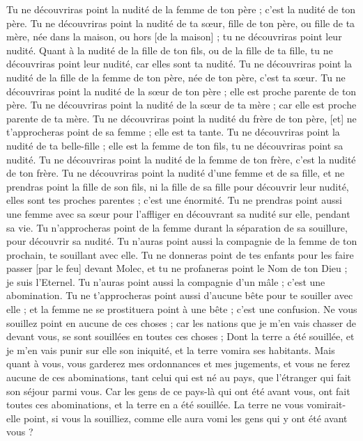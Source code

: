 \begin{multicols}{2}
Tu ne découvriras point la nudité de la femme de ton père ; c'est la nudité de ton père.
Tu ne découvriras point la nudité de ta sœur, fille de ton père, ou fille de ta mère, née dans la maison, ou hors [de la maison] ; tu ne découvriras point leur nudité.
Quant à la nudité de la fille de ton fils, ou de la fille de ta fille, tu ne découvriras point leur nudité, car elles sont ta nudité.
Tu ne découvriras point la nudité de la fille de la femme de ton père, née de ton père, c'est ta sœur.
Tu ne découvriras point la nudité de la sœur de ton père ; elle est proche parente de ton père.
Tu ne découvriras point la nudité de la sœur de ta mère ; car elle est proche parente de ta mère.
Tu ne découvriras point la nudité du frère de ton père, [et] ne t'approcheras point de sa femme ; elle est ta tante.
Tu ne découvriras point la nudité de ta belle-fille ; elle est la femme de ton fils, tu ne découvriras point sa nudité.
Tu ne découvriras point la nudité de la femme de ton frère, c'est la nudité de ton frère.
Tu ne découvriras point la nudité d'une femme et de sa fille, et ne prendras point la fille de son fils, ni la fille de sa fille pour découvrir leur nudité, elles sont tes proches parentes ; c'est une énormité.
Tu ne prendras point aussi une femme avec sa sœur pour l'affliger en découvrant sa nudité sur elle, pendant sa vie.
Tu n'approcheras point de la femme durant la séparation de sa souillure, pour découvrir sa nudité.
Tu n'auras point aussi la compagnie de la femme de ton prochain, te souillant avec elle.
Tu ne donneras point de tes enfants pour les faire passer [par le feu] devant Molec, et tu ne profaneras point le Nom de ton Dieu ; je suis l'Eternel.
Tu n'auras point aussi la compagnie d'un mâle ; c'est une abomination.
Tu ne t'approcheras point aussi d'aucune bête pour te souiller avec elle ; et la femme ne se prostituera point à une bête ; c'est une confusion.
Ne vous souillez point en aucune de ces choses ; car les nations que je m'en vais chasser de devant vous, se sont souillées en toutes ces choses ;
Dont la terre a été souillée, et je m'en vais punir sur elle son iniquité, et la terre vomira ses habitants.
Mais quant à vous, vous garderez mes ordonnances et mes jugements, et vous ne ferez aucune de ces abominations, tant celui qui est né au pays, que l'étranger qui fait son séjour parmi vous.
Car les gens de ce pays-là qui ont été avant vous, ont fait toutes ces abominations, et la terre en a été souillée.
La terre ne vous vomirait-elle point, si vous la souilliez, comme elle aura vomi les gens qui y ont été avant vous ?

\end{multicols}
